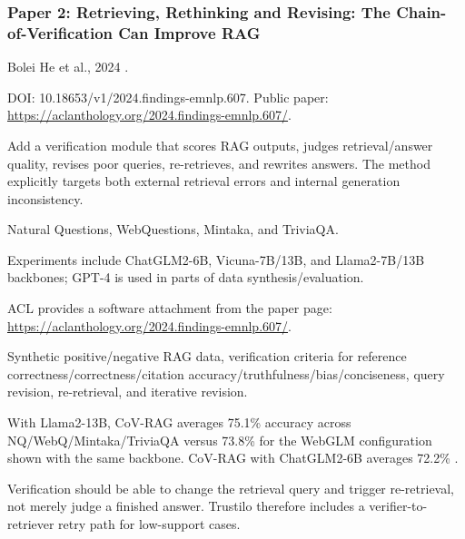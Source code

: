 \documentclass[11pt,journal,onecolumn]{IEEEtran}
\begin{document}
\subsubsection{Paper 2: Retrieving, Rethinking and Revising: The Chain-of-Verification Can Improve RAG}
\begin{description}[leftmargin=3.25cm,style=nextline]
\item[Authors / Year] Bolei He et al., 2024 \cite{he2024covrag}.
\item[DOI / Link] DOI: 10.18653/v1/2024.findings-emnlp.607. Public paper: \url{https://aclanthology.org/2024.findings-emnlp.607/}.
\item[Main idea] Add a verification module that scores RAG outputs, judges retrieval/answer quality, revises poor queries, re-retrieves, and rewrites answers. The method explicitly targets both external retrieval errors and internal generation inconsistency.
\item[Datasets] Natural Questions, WebQuestions, Mintaka, and TriviaQA.
\item[Models] Experiments include ChatGLM2-6B, Vicuna-7B/13B, and Llama2-7B/13B backbones; GPT-4 is used in parts of data synthesis/evaluation.
\item[Code] ACL provides a software attachment from the paper page: \url{https://aclanthology.org/2024.findings-emnlp.607/}.
\item[Procedure / tricks] Synthetic positive/negative RAG data, verification criteria for reference correctness/correctness/citation accuracy/truthfulness/bias/conciseness, query revision, re-retrieval, and iterative revision.
\item[Metrics / results] With Llama2-13B, CoV-RAG averages 75.1\% accuracy across NQ/WebQ/Mintaka/TriviaQA versus 73.8\% for the WebGLM configuration shown with the same backbone. CoV-RAG with ChatGLM2-6B averages 72.2\% \cite{he2024covrag}.
\item[Key learning] Verification should be able to change the retrieval query and trigger re-retrieval, not merely judge a finished answer. Trustilo therefore includes a verifier-to-retriever retry path for low-support cases.
\end{description}
\end{document}
